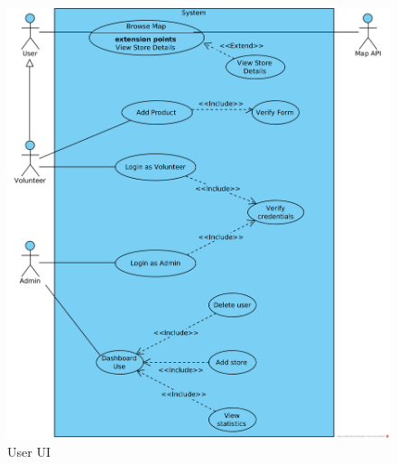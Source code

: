 \begin{figure}[H]
    \centering
    \includegraphics[width = \linewidth]{media/UseCase/User_UI.png}
    \caption{User UI}
    \label{fig:User_UI}
\end{figure}


